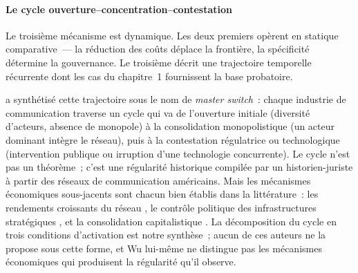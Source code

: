 \paragraph{Le cycle ouverture--concentration--contestation}

\markSTS \markINST \markEVO
Le troisième mécanisme est dynamique. Les deux premiers opèrent en statique comparative~--- la réduction des coûts déplace la frontière, la spécificité détermine la gouvernance. Le troisième décrit une trajectoire temporelle récurrente dont les cas du chapitre~1 fournissent la base probatoire.

\textcite{wu2010master} a synthétisé cette trajectoire sous le nom de \emph{master switch}~: chaque industrie de communication traverse un cycle qui va de l'ouverture initiale (diversité d'acteurs, absence de monopole) à la consolidation monopolistique (un acteur dominant intègre le réseau), puis à la contestation régulatrice ou technologique (intervention publique ou irruption d'une technologie concurrente). Le cycle n'est pas un théorème~; c'est une régularité historique compilée par un historien-juriste à partir des réseaux de communication américains. Mais les mécanismes économiques sous-jacents sont chacun bien établis dans la littérature~: les rendements croissants du réseau \parencite{katz_network_1985}, le contrôle politique des infrastructures stratégiques \parencite{headrick_invisible_1991}, et la consolidation capitalistique \parencite{chandler_visible_1977}. La décomposition du cycle en trois conditions d'activation est notre synthèse~; aucun de ces auteurs ne la propose sous cette forme, et Wu lui-même ne distingue pas les mécanismes économiques qui produisent la régularité qu'il observe.

